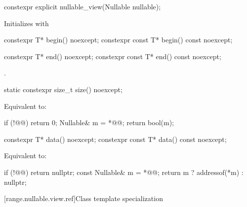\documentclass[a4paper,10pt,oneside,openany,final,article]{memoir}
\begin{document}
\begin{wording}
\begin{itemdecl}
constexpr explicit nullable_view(Nullable nullable);
\end{itemdecl}
\begin{itemdescr}
\pnum{}
\effects{}
Initializes  with 
\end{itemdescr}

\begin{itemdecl}
constexpr T* begin() noexcept;
constexpr const T* begin() const noexcept;
\end{itemdecl}

\begin{itemdescr}
\pnum
\returns
{}
\end{itemdescr}

\begin{itemdecl}
constexpr T* end() noexcept;
constexpr const T* end() const noexcept;
\end{itemdecl}

\begin{itemdescr}
\pnum{}
\returns {}.
\end{itemdescr}

\begin{itemdecl}
static constexpr size_t size() noexcept;
\end{itemdecl}

\begin{itemdescr}
\pnum{}
\effects{}
Equivalent to:

\begin{codeblock}
if (!@@)
  return 0;
Nullable& m = *@@;
return bool(m);
\end{codeblock}
\end{itemdescr}

\begin{itemdecl}
constexpr T* data() noexcept;
constexpr const T* data() const noexcept;
\end{itemdecl}

\begin{itemdescr}
\pnum{}
\effects{}
Equivalent to:
\begin{codeblock}
if (!@@)
  return nullptr;
const Nullable& m = *@@;
return m ? addressof(*m) : nullptr;
\end{codeblock}
\end{itemdescr}



[range.nullable.view.ref]{Class template specialization }


\end{wording}
\end{document}
